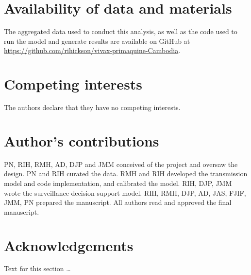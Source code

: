 \documentclass[doublespacing]{bmcart}
\begin{document}
\begin{backmatter}

\section*{Availability of data and materials}
The aggregated data used to conduct this analysis, as well as the code used to run the model and generate results are available on GitHub at \url{https://github.com/rihickson/vivax-primaquine-Cambodia}.  

\section*{Competing interests}
  The authors declare that they have no competing interests.

\section*{Author's contributions}
    PN, RIH, RMH, AD, DJP and JMM conceived of the project and oversaw the design. PN and RIH curated the data. RMH and RIH developed the transmission model and code implementation, and calibrated the model. RIH, DJP, JMM wrote the surveillance decision support model. RIH, RMH, DJP, AD, JAS, FJIF, JMM, PN prepared the manuscript. All authors read and approved the final manuscript.

\section*{Acknowledgements}
  Text for this section \ldots


\end{backmatter}
\end{document}
